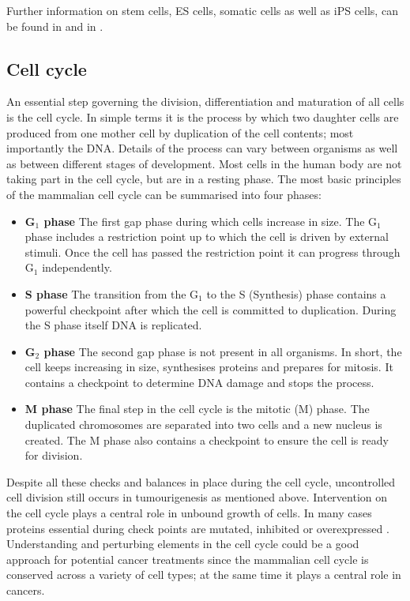 Further information on stem cells, ES cells, somatic cells as well as iPS cells, can be found in \cite{lanza2009essentials} and in \cite{Lanza:2013uk}.

\subsection{Cell cycle}
\label{sec:cell-cycle}

An essential step governing the division, differentiation and maturation of all cells is the cell cycle. In simple terms it is the process by which two daughter cells are produced from one mother cell by duplication of the cell contents; most importantly the DNA. Details of the process can vary between organisms as well as between different stages of development. Most cells in the human body are not taking part in the cell cycle, but are in a resting phase. The most basic principles of the mammalian cell cycle can be summarised into four phases:

\begin{itemize}
\item {\bf G$_1$ phase} The first gap phase during which cells increase in size. The G$_1$ phase includes a restriction point up to which the cell is driven by external stimuli. Once the cell has passed the restriction point it can progress through G$_1$ independently.
\item {\bf S phase} The transition from the G$_1$ to the S (Synthesis) phase contains a powerful checkpoint after which the cell is committed to duplication. During the S phase itself DNA is replicated.
\item {\bf G$_2$ phase} The second gap phase is not present in all organisms. In short, the cell keeps increasing in size, synthesises proteins and prepares for mitosis. It contains a checkpoint to determine DNA damage and stops the process.
\item {\bf M phase} The final step in the cell cycle is the mitotic (M) phase. The duplicated chromosomes are separated into two cells and a new nucleus is created. The M phase also contains a checkpoint to ensure the cell is ready for division.
\end{itemize}

Despite all these checks and balances in place during the cell cycle, uncontrolled cell division  still occurs in tumourigenesis as mentioned above. Intervention on the cell cycle plays a central role in unbound growth of cells. In many cases proteins essential during check points are mutated, inhibited or overexpressed \citep{Williams:2012eg}. Understanding and perturbing elements in the cell cycle could be a good approach for potential cancer treatments since the mammalian cell cycle is conserved across a variety of cell types; at the same time it plays a central role in cancers.

